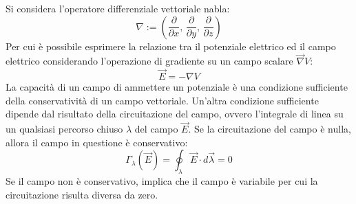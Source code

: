 \documentclass{article}
\numberwithin{equation}{subsection}
\begin{document}
Si considera l'operatore differenziale vettoriale nabla: 
\begin{equation*}
    {\nabla}:=\left(\displaystyle\frac{\partial}{\partial x},\,\frac{\partial}{\partial y},\,\frac{\partial}{\partial z}\right)
\end{equation*}
Per cui è possibile esprimere la relazione tra il potenziale elettrico ed il campo elettrico considerando l'operazione di gradiente su un campo scalare $\vec{\nabla}V$: 
\begin{equation}
    \vec{E}=-{\nabla}V
\end{equation}
La capacità di un campo di ammettere un potenziale è una condizione sufficiente della conservatività di un campo vettoriale. Un'altra condizione sufficiente dipende dal 
risultato della circuitazione del campo, ovvero l'integrale di linea su un qualsiasi percorso chiuso $\lambda$ del campo $\vec{E}$. Se la circuitazione del campo è nulla, 
allora il campo in questione è conservativo:
\begin{equation}
    \Gamma_\lambda(\vec{E})=\displaystyle\oint_{\lambda}\vec{E}\cdot d\vec{\lambda}=0
\end{equation}
Se il campo non è conservativo, implica che il campo è variabile per cui la circuitazione risulta diversa da zero. 
\end{document}
